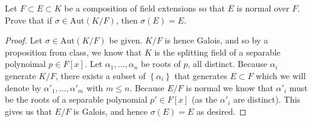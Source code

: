 \documentclass[num=10,duedate=04-14-21,course=Algebra\ II,proflastname=Walton]{hwtemplate}
\begin{document}
\problem[5]
\begin{claim}
	Let \(F\subset E\subset K\) be a composition of field extensions so that \(E\) is normal over \(F\). Prove that if \(\sigma  \in \textrm{Aut}(K / F)\), then \(\sigma (E) = E\).
\end{claim}
\begin{proof}
	Let \(\sigma \in \textrm{Aut}(K / F)\) be given. \(K / F\) is hence Galois, and so by a proposition from class, we know that \(K\) is the splitting field of a separable polynoimal \(p \in F[x]\). Let \(\alpha_1,\ldots,\alpha _n\) be roots of \(p\), all distinct. Because \(\alpha_i\) generate \(K / F\), there exists a subset of \(\left\{ \alpha_i \right\} \) that generates \(E\subset F\) which we will denote by \(\alpha'_1,\ldots,\alpha'_m\) with \(m\leq n\). Because \(E / F\) is normal we know that \(\alpha'_i\) must be the roots of a separable polynomial \(p' \in F[x]\) (as the \(\alpha'_i\) are distinct). This gives us that \(E / F\) is Galois, and hence \(\sigma (E) = E\) as desired.
\end{proof}
\end{document}
